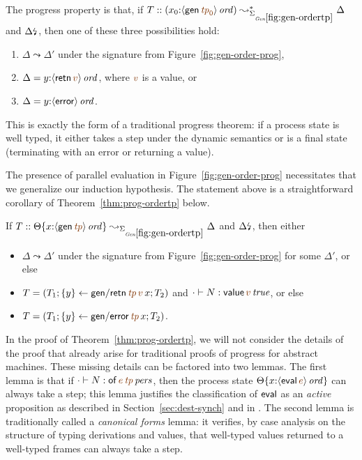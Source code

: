 The progress property is that, if $T ::
(x_0{:}\istrue{\susp{{\sf gen}\,\lf{{\it tp}_0}}})
\leadsto^*_{\siggenordertp} \Delta$ and ${\Delta}{\mbox{\lightning}}_{}$, then
one of these three possibilities hold:

\smallskip
\begin{enumerate}
\item ${\Delta}{} \leadsto \Delta'$ under
the signature from Figure~\ref{fig:gen-order-prog}, 
\item $\Delta = y{:}\istrue{\susp{{\sf retn}\,\lf{v}}}$, where
  $\lf{v}$ is a value, or
\item $\Delta = y{:}{\langle {{\sf error}} \rangle}\,{{\it ord}}$.
\end{enumerate}
\smallskip

\noindent
This is exactly the form of a traditional progress theorem: if a
process state is well typed, it either takes a step under the dynamic
semantics or is a final state (terminating with an error or returning
a value).

The presence of parallel evaluation in Figure~\ref{fig:gen-order-prog}
necessitates that we generalize our induction hypothesis. The
statement above is a straightforward corollary of
Theorem~\ref{thm:prog-ordertp} below.

\bigskip
\begin{theorem}\label{thm:prog-ordertp}
If $T :: \tackon{\Theta}{x{:}\istrue{\susp{{\sf gen}\,\lf{{\it tp}}}}}
\leadsto_{\siggenordertp} \Delta$ and ${\Delta}{\mbox{\lightning}}_{}$, then
either 
\begin{itemize}
\item 
$\Delta \leadsto \Delta'$ under the signature from 
Figure~\ref{fig:gen-order-prog} for some $\Delta'$, or else
\item 
$T = \left(T_1; \trstep{y}{{\sf gen/retn}\,\lf{{\it tp}}\,\lf{v}\,x}; T_2\right)$ and $\cdot \vdash N : \isconc{{\sf value}\,\lf{v}}$, or else 
\item
$T = \left(T_1; \trstep{y}{{\sf gen/error}\,\lf{{\it tp}}\,x}; T_2\right)$.
\end{itemize}
\end{theorem}

\bigskip

In the proof of Theorem~\ref{thm:prog-ordertp}, we will not consider
the details of the proof that already arise for traditional proofs of
progress for abstract machines. These missing details can be factored
into two lemmas. The first lemma is that if $\cdot \vdash N :
\ispers{{\sf of}\,\lf{e}\,\lf{{\it tp}}}$, then the process state
$\tackon{\Theta}{x{:}\istrue{\susp{{\sf eval}\,\lf{e}}}}$ can always
take a step; this lemma justifies the classification of ${\sf eval}$
as an {\it active} proposition as described in
Section~\ref{sec:dest-synch} and in
\cite{pfenning09substructural}. The second lemma is traditionally
called a {\it canonical forms} lemma: it verifies, by case analysis on
the structure of typing derivations and values, that well-typed
values returned to a well-typed frames can always take a step.


